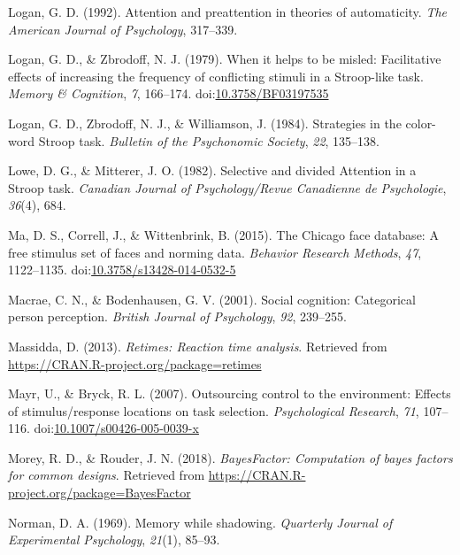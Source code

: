 \documentclass[english,,man,floatsintext]{apa6}
\begin{document}
\leavevmode\hypertarget{ref-logan_attention_1992}{}%
Logan, G. D. (1992). Attention and preattention in theories of automaticity. \emph{The American Journal of Psychology}, 317--339.

\leavevmode\hypertarget{ref-logan_when_1979}{}%
Logan, G. D., \& Zbrodoff, N. J. (1979). When it helps to be misled: Facilitative effects of increasing the frequency of conflicting stimuli in a Stroop-like task. \emph{Memory \& Cognition}, \emph{7}, 166--174. doi:\href{https://doi.org/10.3758/BF03197535}{10.3758/BF03197535}

\leavevmode\hypertarget{ref-logan_strategies_1984}{}%
Logan, G. D., Zbrodoff, N. J., \& Williamson, J. (1984). Strategies in the color-word Stroop task. \emph{Bulletin of the Psychonomic Society}, \emph{22}, 135--138.

\leavevmode\hypertarget{ref-lowe_selective_1982}{}%
Lowe, D. G., \& Mitterer, J. O. (1982). Selective and divided Attention in a Stroop task. \emph{Canadian Journal of Psychology/Revue Canadienne de Psychologie}, \emph{36}(4), 684.

\leavevmode\hypertarget{ref-ma_chicago_2015}{}%
Ma, D. S., Correll, J., \& Wittenbrink, B. (2015). The Chicago face database: A free stimulus set of faces and norming data. \emph{Behavior Research Methods}, \emph{47}, 1122--1135. doi:\href{https://doi.org/10.3758/s13428-014-0532-5}{10.3758/s13428-014-0532-5}

\leavevmode\hypertarget{ref-macrae_social_2001}{}%
Macrae, C. N., \& Bodenhausen, G. V. (2001). Social cognition: Categorical person perception. \emph{British Journal of Psychology}, \emph{92}, 239--255.

\leavevmode\hypertarget{ref-r_retimes_2013}{}%
Massidda, D. (2013). \emph{Retimes: Reaction time analysis}. Retrieved from \url{https://CRAN.R-project.org/package=retimes}

\leavevmode\hypertarget{ref-mayr_outsourcing_2007}{}%
Mayr, U., \& Bryck, R. L. (2007). Outsourcing control to the environment: Effects of stimulus/response locations on task selection. \emph{Psychological Research}, \emph{71}, 107--116. doi:\href{https://doi.org/10.1007/s00426-005-0039-x}{10.1007/s00426-005-0039-x}

\leavevmode\hypertarget{ref-r_bayesfactor_2018}{}%
Morey, R. D., \& Rouder, J. N. (2018). \emph{BayesFactor: Computation of bayes factors for common designs}. Retrieved from \url{https://CRAN.R-project.org/package=BayesFactor}

\leavevmode\hypertarget{ref-norman_memory_1969}{}%
Norman, D. A. (1969). Memory while shadowing. \emph{Quarterly Journal of Experimental Psychology}, \emph{21}(1), 85--93.
\end{document}
